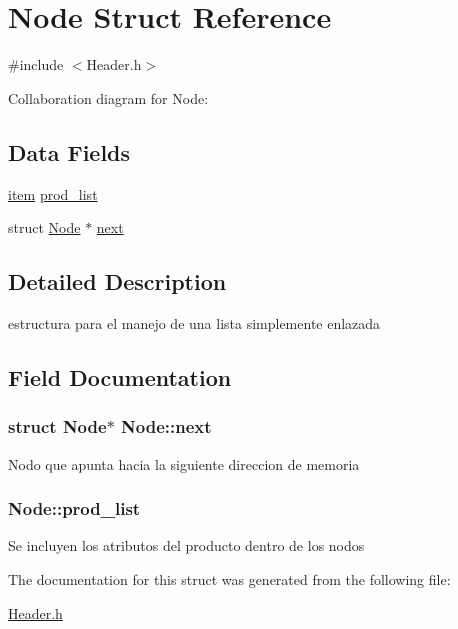 \hypertarget{structNode}{}\section{Node Struct Reference}
\label{structNode}


{\ttfamily \#include $<$Header.\+h$>$}



Collaboration diagram for Node\+:
\subsection*{Data Fields}
\begin{DoxyCompactItemize}
\item 
\hyperlink{Header_8h_a1046d59a6d0e849f416d47596c66c0c0}{item} \hyperlink{structNode_a601ddc8222e9f4fdf22406c9f788d770}{prod\+\_\+list}
\item 
struct \hyperlink{structNode}{Node} $\ast$ \hyperlink{structNode_af67b110ca1a258b793bf69d306929b22}{next}
\end{DoxyCompactItemize}


\subsection{Detailed Description}
estructura para el manejo de una lista simplemente enlazada 

\subsection{Field Documentation}
\subsubsection[{\texorpdfstring{next}{next}}]{\setlength{\rightskip}{0pt plus 5cm}struct {\bf Node}$\ast$ Node\+::next}\hypertarget{structNode_af67b110ca1a258b793bf69d306929b22}{}\label{structNode_af67b110ca1a258b793bf69d306929b22}
Nodo que apunta hacia la siguiente direccion de memoria 
\subsubsection[{\texorpdfstring{prod\+\_\+list}{prod_list}}]{ Node\+::prod\+\_\+list}\hypertarget{structNode_a601ddc8222e9f4fdf22406c9f788d770}{}\label{structNode_a601ddc8222e9f4fdf22406c9f788d770}
Se incluyen los atributos del producto dentro de los nodos 

The documentation for this struct was generated from the following file\+:\begin{DoxyCompactItemize}
\item 
\hyperlink{Header_8h}{Header.\+h}\end{DoxyCompactItemize}

